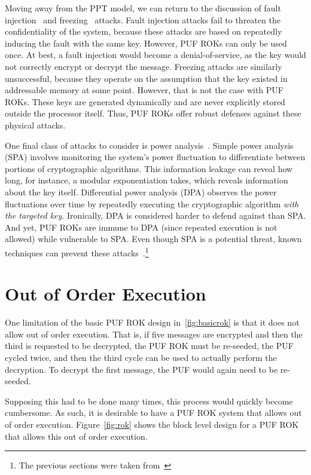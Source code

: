 Moving away from the PPT model, we can return to the discussion of fault
injection~\cite{rsapub,pertrsa,insecrsa,rsaltr,fault} and freezing~\cite{freezing}
attacks.  Fault injection attacks fail to threaten the confidentiality of the system,
because these attacks are based on repeatedly inducing the fault with the same key.  However, PUF ROKs can
only be used once.  At best, a fault injection would become a denial-of-service, as the key would not
correctly encrypt or decrypt the message.  Freezing attacks are similarly unsuccessful, because they operate
on the assumption that the key existed in addressable memory at some point.  However, that is not the case
with PUF ROKs.  These keys are generated dynamically and are never explicitly stored outside the processor
itself.  Thus, PUF ROKs offer robust defenses against these physical attacks.

One final class of attacks to consider is power analysis~\cite{dpa}.  Simple power analysis (SPA) involves
monitoring the system's power fluctuation to differentiate between portions of cryptographic algorithms.
This information leakage can reveal how long, for instance, a modular exponentiation takes, which reveals
information about the key itself.  Differential power analysis (DPA) observes the power fluctuations over
time by repeatedly executing the cryptographic algorithm \emph{with the targeted key}.  Ironically, DPA
is considered harder to defend against than SPA.  And yet, PUF ROKs are immune to DPA (since repeated execution
is not allowed) while vulnerable to SPA.  Even though SPA is a potential threat, known techniques can prevent
these attacks~\cite{sidechan}.\footnote{The previous sections were taken from~\cite{PUFROK}}

\section{Out of Order Execution}
One limitation of the basic PUF ROK design in~\ref{fig:basicrok} is that it does not allow out of order execution. That is,
if five messages are encrypted and then the third is requested to be decrypted, the PUF ROK must be re-seeded, the PUF
cycled twice, and then the third cycle can be used to actually perform the decryption. To decrypt the first message, the
PUF would again need to be re-seeded. 

Supposing this had to be done many times, this process would quickly become cumbersome. As such, it is desirable to
have a PUF ROK system that allows out of order execution. Figure~\ref{fig:rok} shows the block level design for a PUF
ROK that allows this out of order execution.

